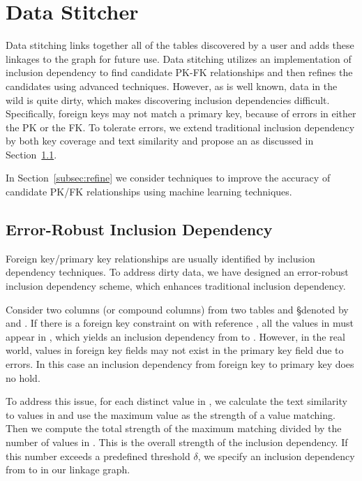 \section{Data Stitcher}
\label{sec:stitching}




Data stitching links together all of the tables discovered by a user  and adds these linkages to the graph for future use. Data stitching utilizes an implementation of inclusion dependency to find candidate PK-FK relationships and then refines the candidates using advanced techniques. However, as is well known, data in the wild is quite dirty, which makes discovering inclusion dependencies difficult.  Specifically, foreign keys may not match a primary key, because of errors in either the PK or the FK. To tolerate errors, we extend traditional inclusion dependency by both key coverage and text similarity and propose an \emph{\eind} as discussed in Section~\ref{subsec:eind}.

In Section~\ref{subsec:refine} we consider techniques to improve the accuracy of candidate PK/FK relationships using machine learning techniques.


\subsection{Error-Robust Inclusion Dependency}\label{subsec:eind}

Foreign key/primary key relationships are usually identified by inclusion dependency techniques. To address dirty data, we have designed an error-robust inclusion dependency scheme, which enhances traditional inclusion dependency.

Consider two columns (or compound columns) from two tables \R and \S denoted by \RX and \SY. If there is a foreign key constraint on \RX with reference \SY, all the values in \RX must appear in \SY, which yields an inclusion dependency from \RX to \SY. However, in the real world, values in foreign key fields may not exist in the primary key field due to errors.  In this case an inclusion dependency from foreign key to primary key does no hold. 

To address this issue, for each distinct value in \RX, we calculate the text similarity to values in \SY and use the maximum value as the strength of a value matching. Then we compute the total strength of the maximum matching divided by the number of values in \RX. This is the overall strength of the inclusion dependency.  If this number exceeds a predefined threshold $\delta$, we specify an inclusion dependency from \RX to \SY in our linkage graph. 

